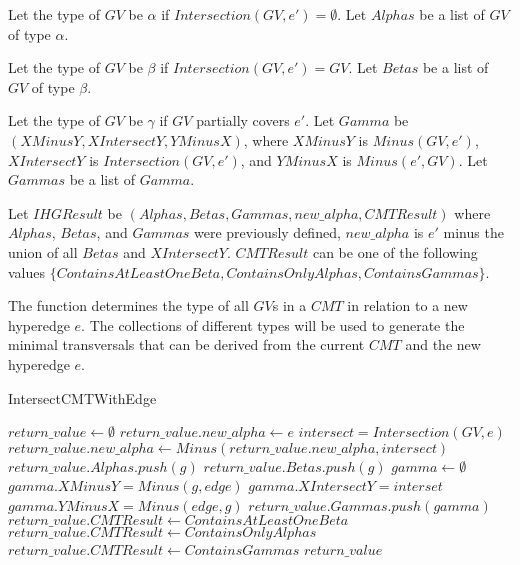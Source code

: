 \begin{definition}
Let the type of $GV$ be $\alpha$ if $Intersection(GV,e') = \emptyset$. 
Let $Alphas$ be a list of $GV$ of type $\alpha$.
\end{definition}

\begin{definition}
Let the type of $GV$ be $\beta$ if $Intersection(GV,e') = GV$.
Let $Betas$ be a list of $GV$ of type $\beta$.
\end{definition}

\begin{definition}
Let the type of $GV$ be $\gamma$ if $GV$ partially covers $e'$.
Let $Gamma$ be $(XMinusY, XIntersectY, YMinusX)$, where $XMinusY$ is $Minus(GV,e')$, $XIntersectY$ is $Intersection(GV,e')$, and $YMinusX$ is $Minus(e',GV)$.  
Let $Gammas$ be a list of $Gamma$.
\end{definition}

\begin{definition}
Let $IHGResult$ be $(Alphas,Betas,Gammas,new\_alpha,CMTResult)$  where $Alphas$, $Betas$, and $Gammas$ were previously defined, $new\_alpha$ is $e'$ minus the union of all $Betas$ and $XIntersectY$. $CMTResult$ can be one of the following values $\{ContainsAtLeastOneBeta,ContainsOnlyAlphas,ContainsGammas\}$.
\end{definition}

The function  determines the type of all $GV$s in a $CMT$ in relation to a new hyperedge $e$. The collections of different types will be used to generate the minimal transversals that can be derived from the current $CMT$ and the new hyperedge $e$.

\begin{algorithm}[H]
    \centering
	\caption{IntersectCMTWithEdge}\label{IntersectCMTWithEdge}
	\begin{algorithmic}[1]
		\State $return\_value \gets \emptyset$ 
		\State $return\_value.new\_alpha \gets e$ 
		\State $intersect = Intersection(GV,e)$
		\State $return\_value.new\_alpha \gets Minus(return\_value.new\_alpha,intersect)$
		 
		\State $return\_value.Alphas.push(g)$
		\Else
		 
		\State $return\_value.Betas.push(g)$		
		\Else
		\State $gamma \gets \emptyset$ 
		\State $gamma.XMinusY = Minus(g,edge)$
		\State $gamma.XIntersectY = interset$
		\State $gamma.YMinusX = Minus(edge,g)$
		\State $return\_value.Gammas.push(gamma)$
		\EndIf
		\EndIf
		\EndFor
		\State $return\_value.CMTResult \gets ContainsAtLeastOneBeta$
		\Else
		\State $return\_value.CMTResult \gets ContainsOnlyAlphas$
		\Else
        \State $return\_value.CMTResult \gets ContainsGammas$		
		\EndIf
		\EndIf
		\State \Return $return\_value$
		\EndFunction
	\end{algorithmic}
\end{algorithm}



